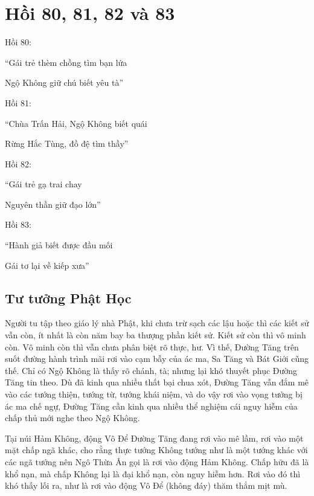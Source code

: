 \chapter{Hồi 80, 81, 82 và 83} %
\label{cha:hoi_80_81}

Hồi 80:

\begin{itshape}
``Gái trẻ thèm chồng tìm bạn lứa

Ngộ Không giữ chú biết yêu tà''
\end{itshape}

Hồi 81:

\begin{itshape}
``Chùa Trấn Hải, Ngộ Không biết quái

Rừng Hắc Tùng, đồ đệ tìm thầy''
\end{itshape}

Hồi 82:

\begin{itshape}
``Gái trẻ gạ trai chay

Nguyên thần giữ đạo lớn''
\end{itshape}

Hồi 83:

\begin{itshape}
``Hành giả biết được đầu mối

Gái tơ lại về kiếp xưa''
\end{itshape}

\section{Tư tưởng Phật Học} %
\label{sec:80_81_phat_hoc}

Người tu tập theo giáo lý nhà Phật, khi chưa trừ sạch các lậu hoặc thì các kiết sử vẫn còn, ít nhất là còn năm bay ba thượng phần kiết sử. Kiết sử còn thì vô minh còn. Vô minh còn thì vẫn chưa phân biệt rõ thực, hư. Vì thế, Đường Tăng trên suốt đường hành trình mãi rơi vào cạm bẫy của ác ma, Sa Tăng và Bát Giới cũng thế. Chỉ có Ngộ Không là thấy rõ chánh, tà; nhưng lại khó thuyết phục Đường Tăng tin theo. Dù đã kinh qua nhiều thất bại chua xót, Đường Tăng vẫn đắm mê vào các tướng thiện, tướng từ, tướng khái niệm, và do vậy rơi vào vọng tưởng bị ác ma chế ngự, Đường Tăng cần kinh qua nhiều thể nghiệm cái nguy hiễm của chấp thủ mới nghe theo Ngộ Không.

Tại núi Hảm Không, động Vô Để Đường Tăng đang rơi vào mê lầm, rơi vào một mặt chấp ngã khác, cho rằng thực tướng Không tướng như là một tướng khác với các ngã tướng nên Ngô Thừa Ân gọi là rơi vào động Hảm Không. Chấp hữu đã là khổ nạn, mà chấp Không lại là đại khổ nạn, còn nguy hiễm hơn. Rơi vào đó thì khó thấy lối ra, như là rơi vào động Vô Để (không đáy) thăm thẳm mịt mù.

